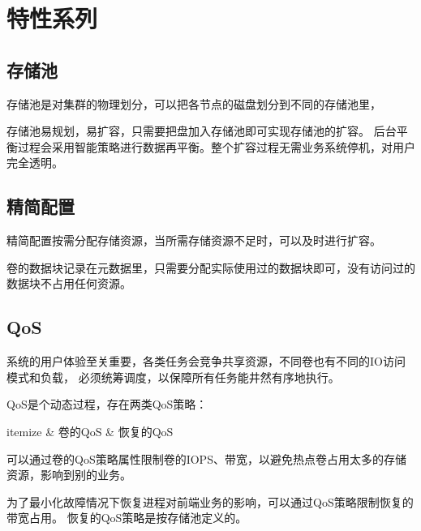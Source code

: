 \chapter{特性系列}

\section{存储池}

存储池是对集群的物理划分，可以把各节点的磁盘划分到不同的存储池里，

存储池易规划，易扩容，只需要把盘加入存储池即可实现存储池的扩容。
后台平衡过程会采用智能策略进行数据再平衡。整个扩容过程无需业务系统停机，对用户完全透明。

\section{精简配置}

精简配置按需分配存储资源，当所需存储资源不足时，可以及时进行扩容。

卷的数据块记录在元数据里，只需要分配实际使用过的数据块即可，没有访问过的数据块不占用任何资源。

\section{QoS}

系统的用户体验至关重要，各类任务会竞争共享资源，不同卷也有不同的IO访问模式和负载，
必须统筹调度，以保障所有任务能井然有序地执行。

QoS是个动态过程，存在两类QoS策略：
\begin{myeasylist}{itemize}
& 卷的QoS
& 恢复的QoS
\end{myeasylist}

可以通过卷的QoS策略属性限制卷的IOPS、带宽，以避免热点卷占用太多的存储资源，影响到别的业务。

为了最小化故障情况下恢复进程对前端业务的影响，可以通过QoS策略限制恢复的带宽占用。
恢复的QoS策略是按存储池定义的。

